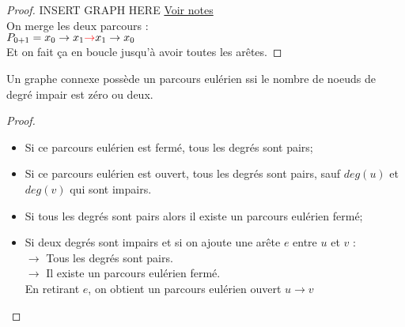 \begin{mytheo} 
\begin{proof}
    INSERT GRAPH HERE \href{https://dl.dropboxusercontent.com/u/44092863/Graph_Theory_Romain_Capron.pdf}{Voir notes} \addTODO\\

    On merge les deux parcours :\\
    $P_{0+1} = x_0 \rightarrow x_1 \textcolor{red}{\rightarrow} x_1 \rightarrow x_0$\\
    Et on fait ça en boucle jusqu'à avoir toutes les arêtes.
  \end{proof}
\end{mytheo}

\begin{mytheo} 
  Un graphe connexe possède un parcours eulérien ssi le nombre de noeuds de degré impair est zéro ou deux.
  \begin{proof}
    \noindent
    \newline
    \fbox{$\Longrightarrow$}
    \newline
    \begin{itemize}
      \item Si ce parcours eulérien est fermé, tous les degrés sont pairs;
      \item Si ce parcours eulérien est ouvert, tous les degrés sont pairs, sauf $deg(u)$ et $deg(v)$ qui sont impairs.\\
    \end{itemize}

    \noindent
    \fbox{$\Longleftarrow$}
    \newline
    \begin{itemize}
      \item Si tous les degrés sont pairs alors il existe un parcours eulérien fermé;
      \item Si deux degrés sont impairs et si on ajoute une arête $e$ entre $u$ et $v$ :\\
      $\rightarrow$ Tous les degrés sont pairs.\\
      $\rightarrow$ Il existe un parcours eulérien fermé.\\
      En retirant $e$, on obtient un parcours eulérien ouvert $u \rightarrow v$
    \end{itemize}
  \end{proof}
\end{mytheo}

